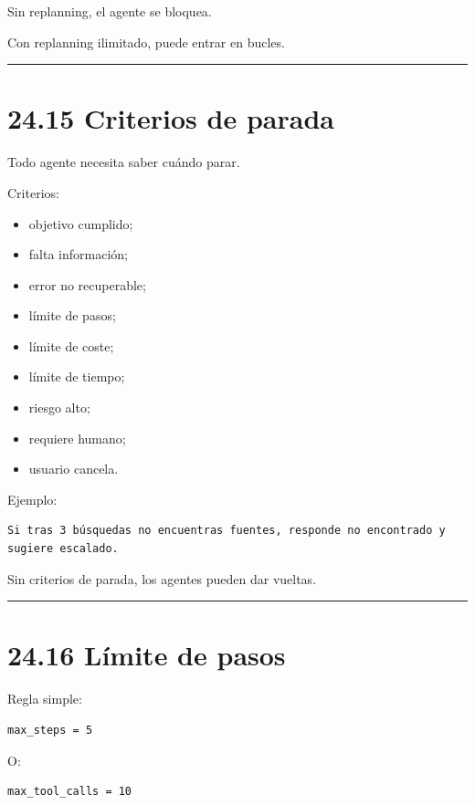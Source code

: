 Sin replanning, el agente se bloquea.

Con replanning ilimitado, puede entrar en bucles.

\begin{center}\rule{0.5\linewidth}{0.5pt}\end{center}

\section{24.15 Criterios de parada}\label{criterios-de-parada}

Todo agente necesita saber cuándo parar.

Criterios:

\begin{itemize}
\tightlist
\item
  objetivo cumplido;
\item
  falta información;
\item
  error no recuperable;
\item
  límite de pasos;
\item
  límite de coste;
\item
  límite de tiempo;
\item
  riesgo alto;
\item
  requiere humano;
\item
  usuario cancela.
\end{itemize}

Ejemplo:

\begin{lstlisting}
Si tras 3 búsquedas no encuentras fuentes, responde no encontrado y sugiere escalado.
\end{lstlisting}

Sin criterios de parada, los agentes pueden dar vueltas.

\begin{center}\rule{0.5\linewidth}{0.5pt}\end{center}

\section{24.16 Límite de pasos}\label{luxedmite-de-pasos}

Regla simple:

\begin{lstlisting}
max_steps = 5
\end{lstlisting}

O:

\begin{lstlisting}
max_tool_calls = 10
\end{lstlisting}

